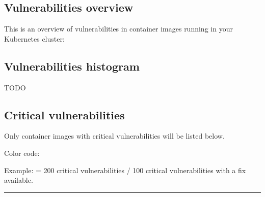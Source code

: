


\subsection{Vulnerabilities overview}
This is an overview of vulnerabilities in container images running in your Kubernetes cluster:




\subsection{Vulnerabilities histogram}

TODO

\subsection{Critical vulnerabilities}
Only container images with critical vulnerabilities will be listed below.


\vskip10pt

Color code:

Example: 
 = 
200 critical vulnerabilities / 100 critical vulnerabilities with a fix available.
\par

\begin{center}
\rule{0.5\linewidth}{1pt}
\end{center}



